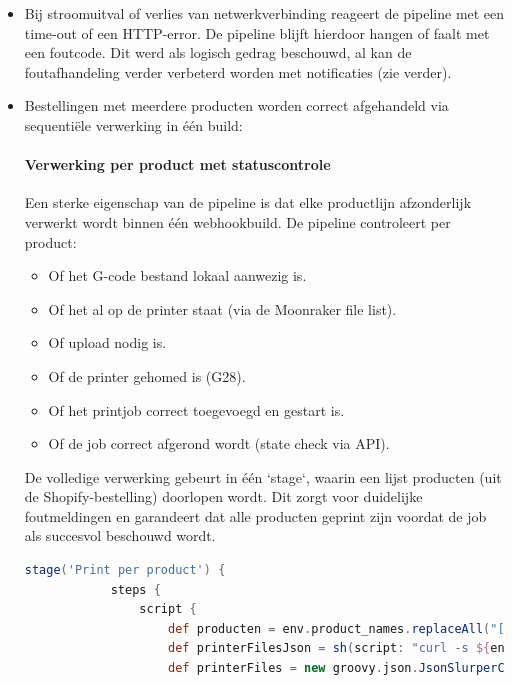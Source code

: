 \begin{enumerate}
\begin{itemize}
    \item Bij stroomuitval of verlies van netwerkverbinding reageert de pipeline met een time-out of een HTTP-error. De pipeline blijft hierdoor hangen of faalt met een foutcode. Dit werd als logisch gedrag beschouwd, al kan de foutafhandeling verder verbeterd worden met notificaties (zie verder).
    
    \item Bestellingen met meerdere producten worden correct afgehandeld via sequentiële verwerking in één build:
    \paragraph{Verwerking per product met statuscontrole}
    
    Een sterke eigenschap van de pipeline is dat elke productlijn afzonderlijk verwerkt wordt binnen één webhookbuild. De pipeline controleert per product:
    
    \begin{itemize}
        \item Of het G-code bestand lokaal aanwezig is.
        \item Of het al op de printer staat (via de Moonraker file list).
        \item Of upload nodig is.
        \item Of de printer gehomed is (G28).
        \item Of het printjob correct toegevoegd en gestart is.
        \item Of de job correct afgerond wordt (state check via API).
    \end{itemize}
    
    De volledige verwerking gebeurt in één `stage`, waarin een lijst producten (uit de Shopify-bestelling) doorlopen wordt. Dit zorgt voor duidelijke foutmeldingen en garandeert dat alle producten geprint zijn voordat de job als succesvol beschouwd wordt.
    
    \begin{lstlisting}[language=groovy, caption=Sequentiële verwerking per product]
        stage('Print per product') {
            steps {
                script {
                    def producten = env.product_names.replaceAll("[\\[\\]\" ]", "").split(",")
                    def printerFilesJson = sh(script: "curl -s ${env.PRINTER_URL}/server/files/list?root=gcodes", returnStdout: true)
                    def printerFiles = new groovy.json.JsonSlurperClassic().parseText(printerFilesJson)
                    

\end{lstlisting}
\end{itemize}
\end{enumerate}
